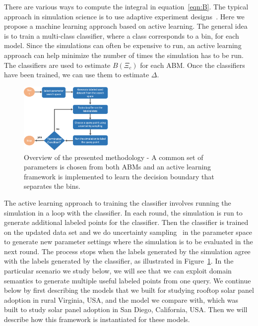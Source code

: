 There are various ways to compute the integral in equation~\ref{eqn:B}. The typical approach in simulation
science is to use adaptive experiment designs~\cite{perez02adaptive}. Here we propose a machine learning approach based on active learning. The general idea is to train a multi-class classifier, where a class corresponds to a bin, for each model. Since the simulations can often be expensive to run, an active learning approach can help minimize the number of times the simulation has to be run.
The classifiers are used to estimate $B(\Xi_{c})$ for each ABM.
Once the classifiers have been trained, we can use them to estimate $\Delta$.

\begin{figure}
    \centering
    \includegraphics[width=0.4\textwidth]{AAMAS20Template-submission/figures/workflow1.png}
    \caption{Overview of the presented methodology - A common set of parameters is chosen from both ABMs and an active learning framework is implemented to learn the decision boundary that separates the bins. }
    \label{fig:workflow}
\end{figure}

The active learning approach to training the classifier involves running the simulation in a loop with the classifier. In each round, the simulation is run to generate additional labeled points for the classifier. Then the classifier is trained on the updated data set and we do uncertainty sampling~\cite{lewis94sequential} in the parameter space to generate new parameter settings where the simulation is to be evaluated in the next round. The process stops when the labels generated by the simulation agree with the labels generated by the classifier, as illustrated in Figure~\ref{fig:workflow}.
In the particular scenario we study below, we will see that we can exploit domain semantics to generate multiple useful labeled points from one query. We continue below by first describing the models that we built for studying rooftop solar panel adoption in rural Virginia, USA, and the model we compare with, which was built to study solar panel adoption in San Diego, California, USA. Then we will describe how this framework is instantiated for these models.